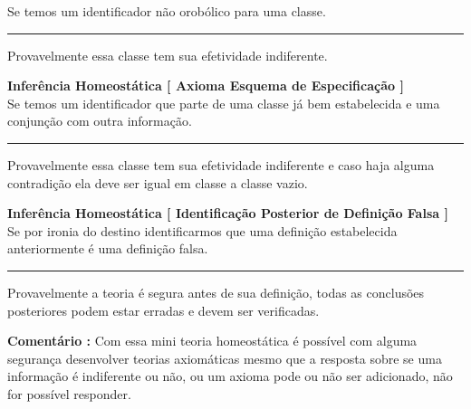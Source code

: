 \documentclass[10pt,a4paper]{report}
\begin{document}
Se temos um identificador não orobólico para uma classe.\\
\hrule 

\hspace{\baselineskip}

Provavelmente essa classe tem sua efetividade indiferente.

% 
\hspace{\baselineskip}

\textbf{Inferência Homeostática [ Axioma Esquema de Especificação ]}\\

Se temos um identificador que parte de uma classe já bem estabelecida e uma conjunção com outra informação. \\
\hrule 

\hspace{\baselineskip}

Provavelmente essa classe tem sua efetividade indiferente e caso haja alguma contradição ela deve ser igual em classe a classe vazio.

% 
\hspace{\baselineskip}

\textbf{Inferência Homeostática [ Identificação Posterior de Definição Falsa ]}\\

Se por ironia do destino identificarmos que uma definição estabelecida anteriormente é uma definição falsa. \\
\hrule 

\hspace{\baselineskip}

Provavelmente a teoria é segura antes de sua definição, todas as conclusões posteriores podem estar erradas e devem ser verificadas.

% 
\hspace{\baselineskip}

\textbf{Comentário :} Com essa mini teoria homeostática é possível com alguma segurança desenvolver teorias axiomáticas mesmo que a resposta sobre se uma informação é indiferente ou não, ou um axioma pode ou não ser adicionado, não for possível responder.

\hspace{\baselineskip}
\end{document}
